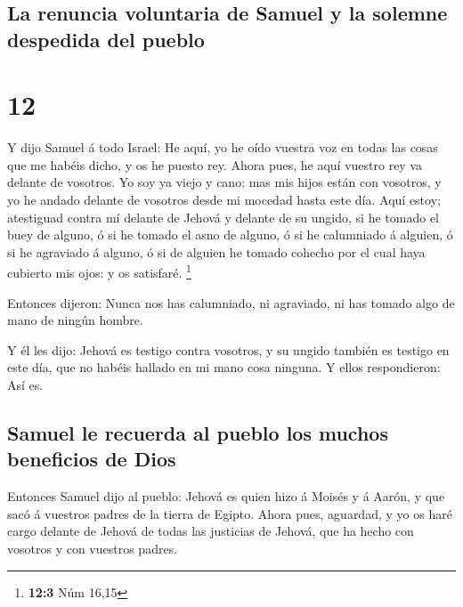 \hypertarget{la-renuncia-voluntaria-de-samuel-y-la-solemne-despedida-del-pueblo}{%
\subsection{La renuncia voluntaria de Samuel y la solemne despedida del
pueblo}\label{la-renuncia-voluntaria-de-samuel-y-la-solemne-despedida-del-pueblo}}

\hypertarget{section-11}{%
\section{12}\label{section-11}}

 Y dijo Samuel á todo Israel: He aquí, yo he oído vuestra
voz en todas las cosas que me habéis dicho, y os he puesto rey.
 Ahora pues, he aquí vuestro rey va delante de vosotros. Yo
soy ya viejo y cano: mas mis hijos están con vosotros, y yo he andado
delante de vosotros desde mi mocedad hasta este día.  Aquí
estoy; atestiguad contra mí delante de Jehová y delante de su ungido, si
he tomado el buey de alguno, ó si he tomado el asno de alguno, ó si he
calumniado á alguien, ó si he agraviado á alguno, ó si de alguien he
tomado cohecho por el cual haya cubierto mis ojos: y os satisfaré.
\footnote{\textbf{12:3} Núm 16,15}

 Entonces dijeron: Nunca nos has calumniado, ni agraviado,
ni has tomado algo de mano de ningún hombre.

 Y él les dijo: Jehová es testigo contra vosotros, y su
ungido también es testigo en este día, que no habéis hallado en mi mano
cosa ninguna. Y ellos respondieron: Así es.

\hypertarget{samuel-le-recuerda-al-pueblo-los-muchos-beneficios-de-dios}{%
\subsection{Samuel le recuerda al pueblo los muchos beneficios de
Dios}\label{samuel-le-recuerda-al-pueblo-los-muchos-beneficios-de-dios}}

 Entonces Samuel dijo al pueblo: Jehová es quien hizo á
Moisés y á Aarón, y que sacó á vuestros padres de la tierra de Egipto.
 Ahora pues, aguardad, y yo os haré cargo delante de Jehová
de todas las justicias de Jehová, que ha hecho con vosotros y con
vuestros padres.

